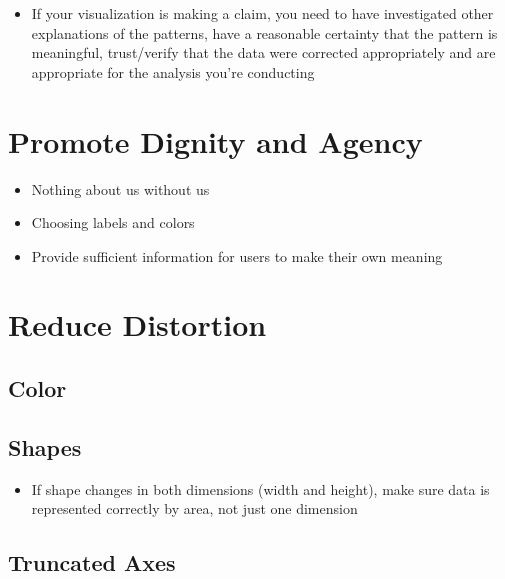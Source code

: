 \documentclass[
]{krantz}
\providecommand{\tightlist}{%
  \setlength{\itemsep}{0pt}\setlength{\parskip}{0pt}}
\begin{document}
\begin{itemize}
\tightlist
\item
  If your visualization is making a claim, you need to have investigated other
  explanations of the patterns, have a reasonable certainty that the pattern is
  meaningful, trust/verify that the data were corrected appropriately and are
  appropriate for the analysis you're conducting
\end{itemize}

\hypertarget{promote-dignity-and-agency}{%
\section{Promote Dignity and Agency}\label{promote-dignity-and-agency}}

\begin{itemize}
\tightlist
\item
  Nothing about us without us
\item
  Choosing labels and colors
\item
  Provide sufficient information for users to make their own meaning
\end{itemize}

\hypertarget{reduce-distortion}{%
\section{Reduce Distortion}\label{reduce-distortion}}

\hypertarget{color}{%
\subsection{Color}\label{color}}

\hypertarget{shapes}{%
\subsection{Shapes}\label{shapes}}

\begin{itemize}
\tightlist
\item
  If shape changes in both dimensions (width and height), make sure data is
  represented correctly by area, not just one dimension
\end{itemize}

\hypertarget{truncated-axes}{%
\subsection{Truncated Axes}\label{truncated-axes}}
\end{document}
